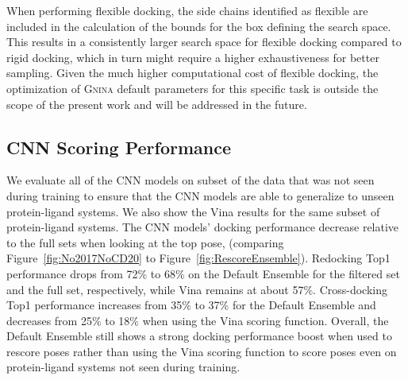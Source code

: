 \documentclass[journal=jcisd8,manuscript=article]{achemso}
\begin{document}
When performing flexible docking, the side chains identified as flexible are included in the calculation of the bounds for the box defining the search space. This results in a consistently larger search space for flexible docking compared to rigid docking, which in turn might require a higher exhaustiveness for better sampling. Given the much higher computational cost of flexible docking, the optimization of \textsc{Gnina} default parameters for this specific task is outside the scope of the present work and will be addressed in the future.

\subsection{CNN Scoring Performance}
We evaluate all of the CNN models on subset of the data that was not seen  during training to ensure that the CNN models are able to generalize to unseen protein-ligand systems. We also show the Vina results for the same subset of protein-ligand systems. The CNN models' docking performance decrease relative to the full sets when looking at the top pose, (comparing Figure~\ref{fig:No2017NoCD20} to Figure~\ref{fig:RescoreEnsemble}). Redocking Top1 performance drops from 72\% to 68\% on the Default Ensemble for the filtered set and the full set, respectively, while Vina remains at about 57\%. Cross-docking Top1 performance increases from 35\% to 37\% for the Default Ensemble and decreases from 25\% to 18\% when using the Vina scoring function. Overall, the Default Ensemble still shows a strong docking performance boost when used to rescore poses rather than using the Vina scoring function to score poses even on protein-ligand systems not seen during training.
\end{document}
